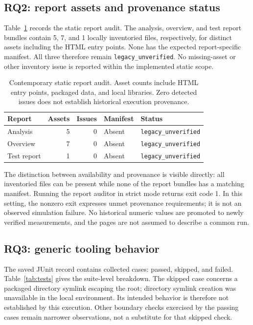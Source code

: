 \documentclass[11pt,a4paper]{article}
\newcommand{\code}[1]{\texttt{#1}}
\begin{document}
\subsection{RQ2: report assets and provenance status}
Table~\ref{tab:reports} records the static report audit. The analysis, overview, and test report bundles contain 5, 7, and 1 locally inventoried files, respectively, for \ReportAssets distinct assets including the HTML entry points. None has the expected report-specific manifest. All three therefore remain \code{legacy\_unverified}. No missing-asset or other inventory issue is reported within the implemented static scope.

\begin{table}[t]
\caption{Contemporary static report audit. Asset counts include HTML entry points, packaged data, and local libraries. Zero detected issues does not establish historical execution provenance.}
\label{tab:reports}
\centering\small
\begin{tabular}{@{}lrrll@{}}
\toprule
Report & Assets & Issues & Manifest & Status \\
\midrule
Analysis & 5 & 0 & Absent & \code{legacy\_unverified} \\
Overview & 7 & 0 & Absent & \code{legacy\_unverified} \\
Test report & 1 & 0 & Absent & \code{legacy\_unverified} \\
\bottomrule
\end{tabular}
\end{table}

The distinction between availability and provenance is visible directly: all inventoried files can be present while none of the report bundles has a matching manifest. Running the report auditor in strict mode returns exit code 1. In this setting, the nonzero exit expresses unmet provenance requirements; it is not an observed simulation failure. No historical numeric values are promoted to newly verified measurements, and the pages are not assumed to describe a common run.

\subsection{RQ3: generic tooling behavior}
The saved JUnit record contains \TestsTotal collected cases: \TestsPassed passed, \TestsSkipped skipped, and \TestsFailed failed. Table~\ref{tab:tests} gives the suite-level breakdown. The skipped case concerns a packaged directory symlink escaping the root; directory symlink creation was unavailable in the local environment. Its intended behavior is therefore not established by this execution. Other boundary checks exercised by the passing cases remain narrower observations, not a substitute for that skipped check.
\end{document}
